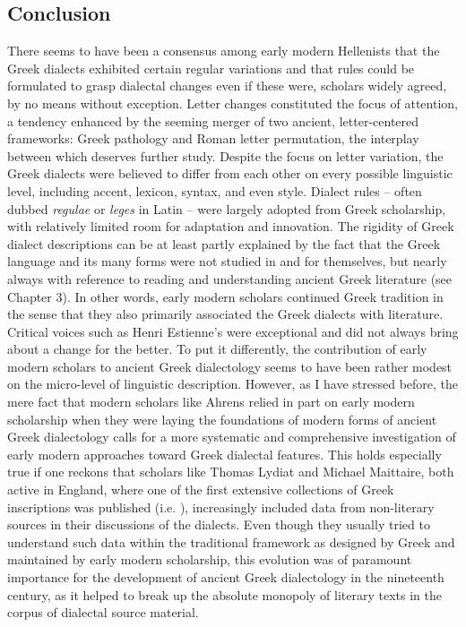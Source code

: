 \subsection{Conclusion}
\hypertarget{Toc19704848}{}
There seems to have been a consensus among early modern Hellenists that the Greek dialects exhibited certain regular variations and that rules could be formulated to grasp dialectal changes even if these were, scholars widely agreed, by no means without exception. Letter changes constituted the focus of attention, a tendency enhanced by the seeming merger of two ancient, letter-centered frameworks: Greek pathology and Roman letter permutation, the interplay between which deserves further study. Despite the focus on letter variation, the Greek dialects were believed to differ from each other on every possible linguistic level, including accent, lexicon, syntax, and even style. Dialect rules – often dubbed \textit{regulae} or \textit{leges} in Latin – were largely adopted from Greek scholarship, with relatively limited room for adaptation and innovation. The rigidity of Greek dialect descriptions can be at least partly explained by the fact that the Greek language and its many forms were not studied in and for themselves, but nearly always with reference to reading and understanding ancient Greek literature (see Chapter 3). In other words, early modern scholars continued Greek tradition in the sense that they also primarily associated the Greek dialects with literature. Critical voices such as Henri Estienne’s were exceptional and did not always bring about a change for the better. To put it differently, the contribution of early modern scholars to ancient Greek dialectology seems to have been rather modest on the micro-level of linguistic description. However, as I have stressed before, the mere fact that modern scholars like Ahrens relied in part on early modern scholarship when they were laying the foundations of modern forms of ancient Greek dialectology calls for a more systematic and comprehensive investigation of early modern approaches toward Greek dialectal features. This holds especially true if one reckons that scholars like Thomas Lydiat and Michael Maittaire, both active in England, where one of the first extensive collections of Greek inscriptions was published (i.e. \citealt{Prideaux1676}), increasingly included data from non-literary sources in their discussions of the dialects. Even though they usually tried to understand such data within the traditional framework as designed by Greek and maintained by early modern scholarship, this evolution was of paramount importance for the development of ancient Greek dialectology in the nineteenth century, as it helped to break up the absolute monopoly of literary texts in the corpus of dialectal source material.

